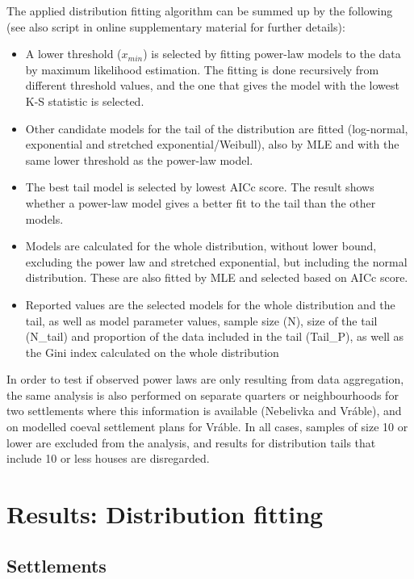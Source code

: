 \documentclass[
  12pt,
  a4paper, twoside]{book}
\begin{document}
The applied distribution fitting algorithm can be summed up by the following (see also script in online supplementary material for further details):

\begin{itemize}
\item
  A lower threshold (\(x_{min}\)) is selected by fitting power-law models to the data by maximum likelihood estimation. The fitting is done recursively from different threshold values, and the one that gives the model with the lowest K-S statistic is selected.
\item
  Other candidate models for the tail of the distribution are fitted (log-normal, exponential and stretched exponential/Weibull), also by MLE and with the same lower threshold as the power-law model.
\item
  The best tail model is selected by lowest AICc score. The result shows whether a power-law model gives a better fit to the tail than the other models.
\item
  Models are calculated for the whole distribution, without lower bound, excluding the power law and stretched exponential, but including the normal distribution. These are also fitted by MLE and selected based on AICc score.
\item
  Reported values are the selected models for the whole distribution and the tail, as well as model parameter values, sample size (N), size of the tail (N\_tail) and proportion of the data included in the tail (Tail\_P), as well as the Gini index calculated on the whole distribution
\end{itemize}

In order to test if observed power laws are only resulting from data aggregation, the same analysis is also performed on separate quarters or neighbourhoods for two settlements where this information is available (Nebelivka and Vráble), and on modelled coeval settlement plans for Vráble. In all cases, samples of size 10 or lower are excluded from the analysis, and results for distribution tails that include 10 or less houses are disregarded.

\hypertarget{results-distfit}{%
\chapter{Results: Distribution fitting}\label{results-distfit}}

\hypertarget{settlements}{%
\section{Settlements}\label{settlements}}
\end{document}
